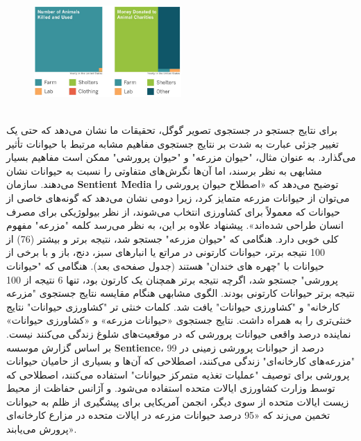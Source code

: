 \begin{figure}
    \centering
    \includegraphics[width=0.5\textwidth, trim={0 2cm 0 0}]{static/assets/img/figure}
    \label{fig:figure2}
\end{figure}
‌
\newline
\newline
\\



برای نتایج جستجو در جستجوی تصویر گوگل، تحقیقات ما نشان می‌دهد که حتی یک تغییر جزئی عبارت به شدت بر نتایج جستجوی مفاهیم مشابه مرتبط با حیوانات تأثیر می‌گذارد.
به عنوان مثال، "حیوان مزرعه" و "حیوان پرورشی" ممکن است مفاهیم بسیار مشابهی به نظر برسند، اما آن‌ها نگرش‌های متفاوتی را نسبت به حیوانات نشان می‌دهند.
سازمان \textenglish{\textbf{Sentient Media}} توضیح می‌دهد که «اصطلاح حیوان پرورشی را می‌توان از حیوانات مزرعه متمایز کرد، زیرا دومی نشان می‌دهد که گونه‌های خاصی از حیوانات که معمولاً برای کشاورزی انتخاب می‌شوند، از نظر بیولوژیکی برای مصرف انسان طراحی شده‌اند».
پیشنهاد علاوه بر این، به نظر می‌رسد کلمه "مزرعه" مفهوم کلی خوبی دارد.
هنگامی که "حیوان مزرعه" جستجو شد، نتیجه برتر و بیشتر (76) از 100 نتیجه برتر، حیوانات کارتونی در مراتع یا انبارهای سبز، دنج، باز و با برخی از حیوانات با "چهره های خندان" هستند (جدول صفحه‌ی بعد).
هنگامی که "حیوانات پرورشی" جستجو شد، اگرچه نتیجه برتر همچنان یک کارتون بود، تنها 6 نتیجه از 100 نتیجه برتر حیوانات کارتونی بودند.
الگوی مشابهی هنگام مقایسه نتایج جستجوی "مزرعه کارخانه" و "کشاورزی حیوانات" یافت شد.
کلمات خنثی تر "کشاورزی حیوانات" نتایج خنثی‌تری را به همراه داشت.
نتایج جستجوی «حیوانات مزرعه» و «کشاورزی حیوانات» نماینده درصد واقعی حیوانات پرورشی که در موقعیت‌های شلوغ زندگی می‌کنند نیست.
بر اساس گزارش موسسه \textenglish{\textbf{Sentience}}، 99 درصد از حیوانات پرورشی زمینی در "مزرعه‌های کارخانه‌ای" زندگی می‌کنند، اصطلاحی که آن‌ها و بسیاری از حامیان حیوانات پرورشی برای توصیف "عملیات تغذیه متمرکز حیوانات" استفاده می‌کنند، اصطلاحی که توسط وزارت کشاورزی ایالات متحده استفاده می‌شود.
و آژانس حفاظت از محیط زیست ایالات متحده از سوی دیگر، انجمن آمریکایی برای پیشگیری از ظلم به حیوانات تخمین می‌زند که «95 درصد حیوانات مزرعه در ایالات متحده در مزارع کارخانه‌ای پرورش می‌یابند».




